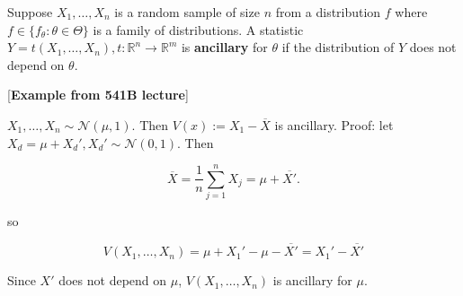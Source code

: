 \begin{definition} Suppose \(X_1, \ldots, X_n\) is a random sample of size \(n\) from a distribution \(f\) where \(f \in \{f_\theta: \theta \in \Theta\}\) is a family of distributions. A statistic \(Y = t(X_1, \ldots, X_n), t: \mathbb{R}^n \to \mathbb{R}^m\) is \textbf{ancillary} for \(\theta\) if the distribution of \(Y\) does not depend on \(\theta\).

\end{definition}

\begin{example}\label{mathstats.541b.x.minus.indep}[\textbf{Example from 541B lecture}]

\(X_1, \ldots, X_n \sim \mathcal{N}(\mu, 1)\). Then \(V(x) := X_1 - \overline{X}\) is ancillary. Proof: let \(X_d = \mu + X_d', X_d' \sim \mathcal{N}(0, 1)\). Then 

\[
\overline{X} = \frac{1}{n} \sum_{j=1}^n X_j = \mu + \overline{X'}.
\]

so

\[
V(X_1, \ldots, X_n) = \mu + X_1' - \mu - \overline{X'} =  X_1' - \overline{X'}
\]

Since \(X'\) does not depend on \(\mu\), \(V(X_1, \ldots, X_n)\) is ancillary for \(\mu\).

\end{example}

